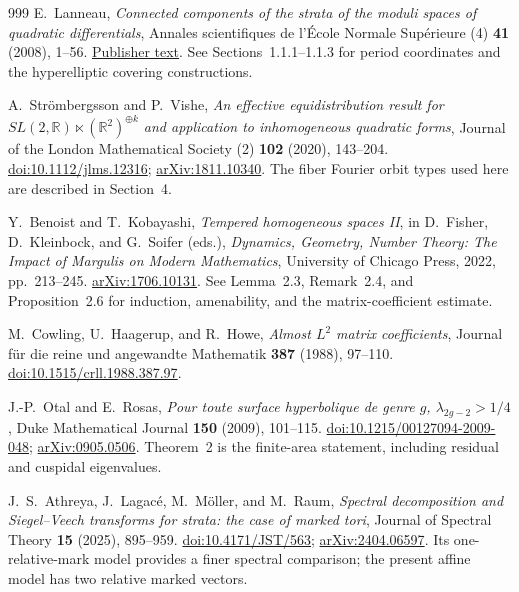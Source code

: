 \documentclass[11pt,a4paper]{article}
\numberwithin{equation}{section}
\theoremstyle{definition}
\theoremstyle{remark}
\newcommand{\RR}{\mathbb R}
\begin{document}
\begin{thebibliography}{999}
E.~Lanneau,
\emph{Connected components of the strata of the moduli spaces of quadratic differentials},
Annales scientifiques de l'\'Ecole Normale Sup\'erieure (4)
\textbf{41} (2008), 1--56.
\href{https://www.numdam.org/item/ASENS_2008_4_41_1_1_0/}{Publisher text}.
See Sections~1.1.1--1.1.3 for period coordinates and the hyperelliptic covering constructions.

A.~Str\"ombergsson and P.~Vishe,
\emph{An effective equidistribution result for
$SL(2,\RR)\ltimes(\RR^2)^{\oplus k}$ and application to
inhomogeneous quadratic forms},
Journal of the London Mathematical Society (2) \textbf{102} (2020), 143--204.
\href{https://doi.org/10.1112/jlms.12316}{doi:10.1112/jlms.12316};
\href{https://arxiv.org/abs/1811.10340}{arXiv:1811.10340}.
The fiber Fourier orbit types used here are described in Section~4.

Y.~Benoist and T.~Kobayashi,
\emph{Tempered homogeneous spaces II},
in D.~Fisher, D.~Kleinbock, and G.~Soifer (eds.),
\emph{Dynamics, Geometry, Number Theory: The Impact of Margulis on Modern Mathematics},
University of Chicago Press, 2022, pp.~213--245.
\href{https://arxiv.org/abs/1706.10131}{arXiv:1706.10131}.
See Lemma~2.3, Remark~2.4, and Proposition~2.6 for induction,
amenability, and the matrix-coefficient estimate.

M.~Cowling, U.~Haagerup, and R.~Howe,
\emph{Almost $L^2$ matrix coefficients},
Journal f\"ur die reine und angewandte Mathematik \textbf{387} (1988), 97--110.
\href{https://doi.org/10.1515/crll.1988.387.97}{doi:10.1515/crll.1988.387.97}.

J.-P.~Otal and E.~Rosas,
\emph{Pour toute surface hyperbolique de genre $g$, $\lambda_{2g-2}>1/4$},
Duke Mathematical Journal \textbf{150} (2009), 101--115.
\href{https://doi.org/10.1215/00127094-2009-048}{doi:10.1215/00127094-2009-048};
\href{https://arxiv.org/abs/0905.0506}{arXiv:0905.0506}.
Theorem~2 is the finite-area statement, including residual and cuspidal
eigenvalues.

J.~S.~Athreya, J.~Lagac\'e, M.~M\"oller, and M.~Raum,
\emph{Spectral decomposition and Siegel--Veech transforms for strata:
the case of marked tori},
Journal of Spectral Theory \textbf{15} (2025), 895--959.
\href{https://doi.org/10.4171/JST/563}{doi:10.4171/JST/563};
\href{https://arxiv.org/abs/2404.06597}{arXiv:2404.06597}.
Its one-relative-mark model provides a finer spectral comparison; the
present affine model has two relative marked vectors.


\end{thebibliography}
\end{document}
